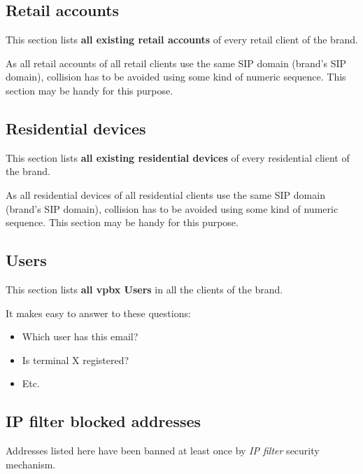 \documentclass[letterpaper,10pt,spanish]{sphinxmanual}
\begin{document}
\subsection{Retail accounts}
\label{administration_portal/brand/views/retail_accounts::doc}\label{administration_portal/brand/views/retail_accounts:retail-accounts}
This section lists \textbf{all existing retail accounts} of every retail client of the brand.

As all retail accounts of all retail clients use the same SIP domain (brand's SIP domain), collision has to be
avoided using some kind of numeric sequence. This section may be handy for this purpose.


\subsection{Residential devices}
\label{administration_portal/brand/views/residential_devices::doc}\label{administration_portal/brand/views/residential_devices:residential-devices}
This section lists \textbf{all existing residential devices} of every residential client of the brand.

As all residential devices of all residential clients use the same SIP domain (brand's SIP domain), collision has to be
avoided using some kind of numeric sequence. This section may be handy for this purpose.


\subsection{Users}
\label{administration_portal/brand/views/users::doc}\label{administration_portal/brand/views/users:users}
This section lists \textbf{all vpbx Users} in all the clients of the brand.

It makes easy to answer to these questions:
\begin{itemize}
\item {} 
Which user has this email?

\item {} 
Is terminal X registered?

\item {} 
Etc.

\end{itemize}


\subsection{IP filter blocked addresses}
\label{administration_portal/brand/views/ipfilter_blocked_addresses:ip-filter-blocked-addresses}\label{administration_portal/brand/views/ipfilter_blocked_addresses::doc}\label{administration_portal/brand/views/ipfilter_blocked_addresses:id1}
Addresses listed here have been banned at least once by \emph{IP filter} security mechanism.
\end{document}
